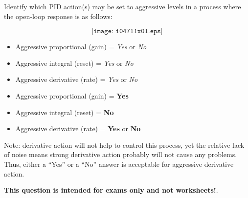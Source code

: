 

Identify which PID action(s) may be set to aggressive levels in a process where the open-loop response is as follows:

$$\texttt{[image: i04711x01.eps]}$$

\begin{itemize}
\item{} Aggressive proportional (gain) = {\it Yes} or {\it No}
\vskip 10pt
\item{} Aggressive integral (reset) = {\it Yes} or {\it No} 
\vskip 10pt
\item{} Aggressive derivative (rate) = {\it Yes} or {\it No} 
\end{itemize}







\begin{itemize}
\item{} Aggressive proportional (gain) = {\bf Yes}
\vskip 10pt
\item{} Aggressive integral (reset) = {\bf No} 
\vskip 10pt
\item{} Aggressive derivative (rate) = {\bf Yes} or {\bf No} 
\end{itemize}

Note: derivative action will not help to control this process, yet the relative lack of noise means strong derivative action probably will not cause any problems.  Thus, either a ``Yes'' or a ``No'' answer is acceptable for aggressive derivative action.







{\bf This question is intended for exams only and not worksheets!}.


